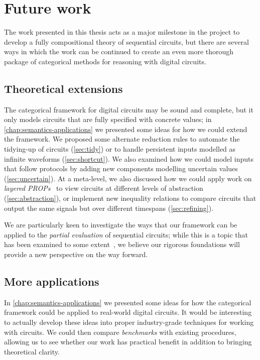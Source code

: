 \section{Future work}

The work presented in this thesis acts as a major milestone in the project to
develop a fully compositional theory of sequential circuits,
but there are several ways in which the work can be continued to create an
even more thorough package of categorical methods for reasoning with digital
circuits.

\subsection{Theoretical extensions}

The categorical framework for digital circuits may be sound and complete, but
it only models circuits that are fully specified with concrete values; in
\cref{chap:semantics-applications} we presented some ideas for how we could
extend the framework.
We proposed some alternate reduction rules to automate the tidying-up of
circuits (\cref{sec:tidy}) or to handle persistent inputs modelled as infinite
waveforms (\cref{sec:shortcut}).
We also examined how we could model inputs that follow protocols by adding new
components modelling uncertain values (\cref{sec:uncertain}).
At a meta-level, we also discussed how we could apply work on
\emph{layered PROPs}~\cite{lobski2022string} to view circuits at different
levels of abstraction (\cref{sec:abstraction}), or implement new inequality
relations to compare circuits that output the same signals but over different
timespans (\cref{sec:refining}).

We are particularly keen to investigate the ways that our framework can be
applied to the \emph{partial evaluation} of sequential circuits; while this is a
topic that has been examined to some
extent~\cite{singh1999partial,mckay1998dynamic,thompson2006bitlevel}, we believe
our rigorous foundations will provide a new perspective on the way forward.

\subsection{More applications}

In \cref{chap:semantics-applications} we presented some ideas for how
the categorical framework could be applied to real-world digital circuits.
It would be interesting to actually develop these ideas into proper
industry-grade techniques for working with circuits.
We could then compare \emph{benchmarks} with existing procedures, allowing us to
see whether our work has practical benefit in addition to bringing theoretical
clarity.

